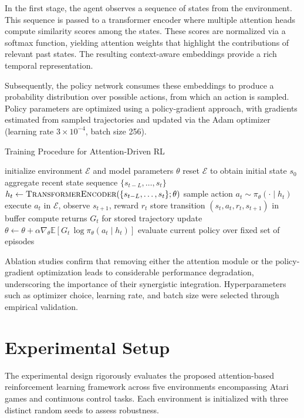 \documentclass{article}
\begin{document}
In the first stage, the agent observes a sequence of states from the environment. This sequence is passed to a transformer encoder where multiple attention heads compute similarity scores among the states. These scores are normalized via a softmax function, yielding attention weights that highlight the contributions of relevant past states. The resulting context-aware embeddings provide a rich temporal representation.

Subsequently, the policy network consumes these embeddings to produce a probability distribution over possible actions, from which an action is sampled. Policy parameters are optimized using a policy-gradient approach, with gradients estimated from sampled trajectories and updated via the Adam optimizer (learning rate $3\!\times\!10^{-4}$, batch size 256).

\begin{algorithm}[H]
\caption{Training Procedure for Attention-Driven RL}
\begin{algorithmic}[1]
  \State initialize environment $\mathcal{E}$ and model parameters $\theta$
    \State reset $\mathcal{E}$ to obtain initial state $s_0$
      \State aggregate recent state sequence $\{s_{t-L},\dots,s_t\}$
      \State $h_t \gets \textsc{TransformerEncoder}(\{s_{t-L},\dots,s_t\};\theta)$
      \State sample action $a_t \sim \pi_\theta(\cdot\mid h_t)$
      \State execute $a_t$ in $\mathcal{E}$, observe $s_{t+1}$, reward $r_t$
      \State store transition $(s_t,a_t,r_t,s_{t+1})$ in buffer
    \EndWhile
    \State compute returns $G_t$ for stored trajectory
    \State update $\theta \leftarrow \theta + \alpha \nabla_\theta \mathbb{E}[G_t\,\log \pi_\theta(a_t\mid h_t)]$
      \State evaluate current policy over fixed set of episodes
    \EndIf
  \EndFor
\end{algorithmic}
\end{algorithm}

Ablation studies confirm that removing either the attention module or the policy-gradient optimization leads to considerable performance degradation, underscoring the importance of their synergistic integration. Hyperparameters such as optimizer choice, learning rate, and batch size were selected through empirical validation.

\section{Experimental Setup}
The experimental design rigorously evaluates the proposed attention-based reinforcement learning framework across five environments encompassing Atari games and continuous control tasks. Each environment is initialized with three distinct random seeds to assess robustness.
\end{document}

